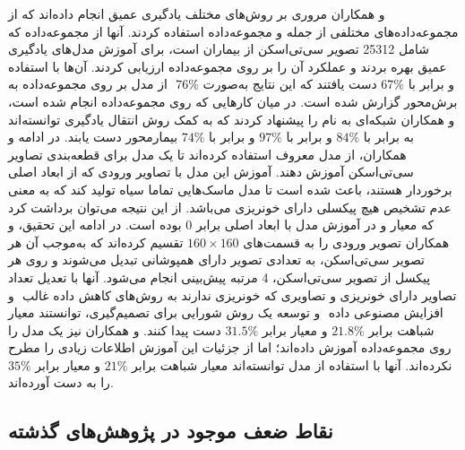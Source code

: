  \cite{neethi2022stroke} و همکاران 
 مروری بر روش‌های مختلف یادگیری عمیق انجام داده‌اند که از مجموعه‌داده‌های مختلفی از جمله  و مجموعه‌داده  استفاده کردند. آنها از مجموعه‌داده  که شامل 25312 تصویر سی‌تی‌اسکن از بیماران است، برای آموزش مدل‌های یادگیری عمیق بهره بردند و عملکرد آن را بر روی مجموعه‌داده  ارزیابی کردند. آن‌ها با استفاده از مدل  بر روی مجموعه‌داده  به
  ‎ \(76\%\) و 
   برابر با 
   \(67\%\) 
   دست یافتند که این نتایج به‌صورت برش‌محور
   گزارش شده است.
 در میان کارهایی که روی مجموعه‌داده  انجام شده است،
  \cite{kyung2022improved}
و همکاران
شبکه‌ای به نام 
را پیشنهاد کردند که به کمک روش انتقال یادگیری
توانسته‌اند به  برابر با
 \(84\%\)
 و 
 برابر با 
  \(97\%\)
  و 
  برابر با
  \(74\%\)
  بیمارمحور 
   دست یابند.
 در ادامه 
 \cite{physionet_hssayeni2020intracranial}
 و همکاران، از مدل معروف 
 استفاده کرده‌اند تا یک مدل برای قطعه‌بندی تصاویر سی‌تی‌اسکن آموزش دهند. آموزش این مدل با تصاویر ورودی که از ابعاد اصلی برخوردار هستند، باعث شده است تا مدل ماسک‌هایی
 تماما سیاه تولید کند که به معنی عدم تشخیص هیچ پیکسلی دارای خونریزی می‌باشد. از این نتیجه می‌توان برداشت کرد که معیار 
 و 
 در آموزش مدل با ابعاد اصلی برابر 0 بوده است. در ادامه این تحقیق، 
  و همکاران تصویر ورودی را به قسمت‌های 
  $160\times160$
  تقسیم کرده‌اند که به‌موجب آن هر تصویر سی‌تی‌اسکن، به تعدادی تصویر دارای همپوشانی تبدیل می‌شوند و روی هر پیکسل از تصویر سی‌تی‌اسکن، 4 مرتبه پیش‌بینی انجام می‌شود. آنها با تعدیل تعداد تصاویر دارای خونریزی و تصاویری که خونریزی ندارند به روش‌های کاهش داده غالب
  ‌
   و افزایش مصنوعی داده
   ‌
   و توسعه یک روش شورایی برای تصمیم‌گیری، توانستند معیار شباهت 
   برابر 
   $21.8\%$
    و معیار 
    برابر 
    $31.5\%$
    دست پیدا کنند.
    \cite{li2020deep}
    و همکاران نیز یک مدل 
    را روی مجموعه‌داده
    آموزش داده‌اند؛ اما از جزئیات این آموزش اطلاعات زیادی را مطرح نکرده‌اند. آنها با استفاده از مدل
    توانسته‌اند معیار شباهت 
    برابر 
    $21\%$
    و معیار
    برابر 
    $35\%$
    را به ‌دست‌ آورده‌اند.
 \subsection{نقاط ضعف موجود در پژوهش‌های گذشته}
 
